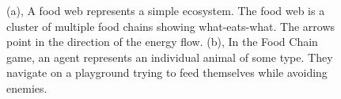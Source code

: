 \documentclass[]{interact}
\theoremstyle{plain}%
\theoremstyle{definition}
\theoremstyle{remark}
\begin{document}
\begin{figure}
\centering
{}
\caption{(a), A food web represents a simple ecosystem. The food web is a cluster of multiple food chains showing what-eats-what. The arrows point in the direction of the energy flow. (b), In the Food Chain game, an agent represents an individual animal of some type. They navigate on a playground trying to feed themselves while avoiding enemies.}
\label{fig:food_chain_game}
\end{figure}
\end{document}
